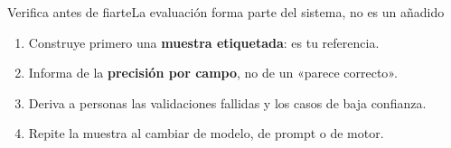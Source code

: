 \begin{frame}{Verifica antes de fiarte}{La evaluación forma parte del sistema, no es un añadido}
	\begin{enumerate}
		\item Construye primero una \textbf{muestra etiquetada}: es tu referencia.
		\item Informa de la \textbf{precisión por campo}, no de un «parece correcto».
		\item Deriva a personas las validaciones fallidas y los casos de baja confianza.
		\item Repite la muestra al cambiar de modelo, de prompt o de motor.
	\end{enumerate}
\end{frame}
